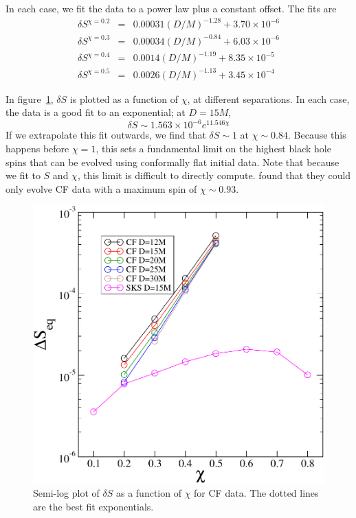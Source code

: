 In each case, we fit the data to
a power law plus a constant offset. The fits are
\begin{eqnarray*}
\delta S^{\chi = 0.2} &=&
0.00031\left(D/M\right)^{-1.28}+3.70\times 10^{-6} \\
\delta S^{\chi = 0.3} &=&
0.00034\left(D/M\right)^{-0.84}+6.03\times 10^{-6} \\
\delta S^{\chi = 0.4} &=&
0.0014\left(D/M\right)^{-1.19}+8.35\times 10^{-5} \\
\delta S^{\chi = 0.5} &=&
0.0026\left(D/M\right)^{-1.13}+3.45\times 10^{-4}
\end{eqnarray*}

In figure~\ref{fig:SvsS}, $\delta S$ is plotted as a function
of $\chi$, at different separations. In each case, the data is a good
fit to an exponential; at $D=15M$,
\begin{equation}
\delta S \sim 1.563\times10^{-6}e^{11.546\chi}
\end{equation}
If we extrapolate this fit outwards, we find that $\delta S\sim 1$ at
$\chi\sim0.84$. Because this happens before $\chi=1$, this sets a fundamental limit on the highest black
hole spins that can be evolved using conformally flat initial
data. Note that because we fit to $S$ and $\chi$, this limit is
difficult to directly compute. \cite{Lovelace2008} found that they could only evolve CF data
with a maximum spin of $\chi\sim0.93$.

\begin{figure}[!htbp]
\includegraphics[scale=0.95]{chap5/SvsS2}
\caption{Semi-log plot of $\delta S$ as a function of $\chi$ for CF data. The
  dotted lines are the best fit exponentials.}
\label{fig:SvsS}
\end{figure}


